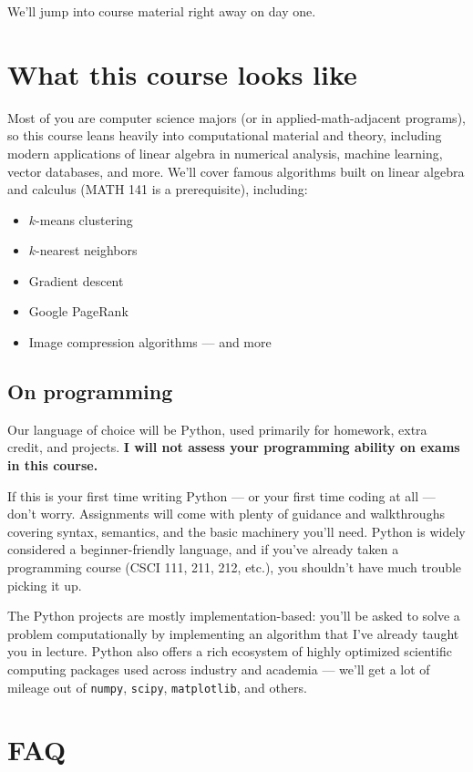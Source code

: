\documentclass[11pt]{article}
\begin{document}
We'll jump into course material right away on day one.

\section{What this course looks like}

Most of you are computer science majors (or in applied-math-adjacent programs), so this course leans heavily into computational material and theory, including modern applications of linear algebra in numerical analysis, machine learning, vector databases, and more. We'll cover famous algorithms built on linear algebra and calculus (MATH 141 is a prerequisite), including:

\begin{itemize}
  \item $k$-means clustering
  \item $k$-nearest neighbors
  \item Gradient descent
  \item Google PageRank
  \item Image compression algorithms --- and more
\end{itemize}

\subsection*{On programming}

Our language of choice will be Python, used primarily for homework, extra credit, and projects. \textbf{I will not assess your programming ability on exams in this course.}

If this is your first time writing Python --- or your first time coding at all --- don't worry. Assignments will come with plenty of guidance and walkthroughs covering syntax, semantics, and the basic machinery you'll need. Python is widely considered a beginner-friendly language, and if you've already taken a programming course (CSCI 111, 211, 212, etc.), you shouldn't have much trouble picking it up.

The Python projects are mostly implementation-based: you'll be asked to solve a problem computationally by implementing an algorithm that I've already taught you in lecture. Python also offers a rich ecosystem of highly optimized scientific computing packages used across industry and academia --- we'll get a lot of mileage out of \texttt{numpy}, \texttt{scipy}, \texttt{matplotlib}, and others.

\section{FAQ}
\end{document}
